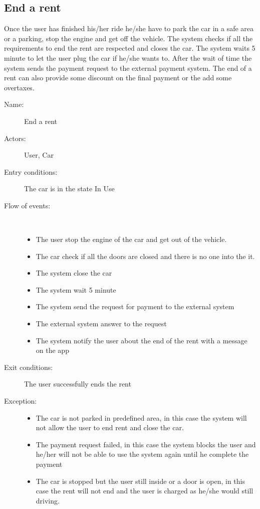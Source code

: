\subsection{End a rent}
Once the user has finished his/her ride he/she have to park the car in a safe area or a parking, stop the engine and get off the vehicle. The system checks if all the requirements to end the rent are respected and closes the car. The system waits 5 minute to let the user plug the car if he/she wants to. After the wait of time the system sends the payment request to the external payment system. The end of a rent can also provide some discount on the final payment or the add some overtaxes.
\begin{description}
	\item[Name:] End a rent
	\item[Actors:] User, Car
	\item[Entry conditions:] The car is in the state In Use
	\item[Flow of events:]  \ \\
		\begin{itemize}
			\item The user stop the engine of the car and get out of the vehicle.
			\item The car check if all the doors are closed and there is no one into the it.
			\item The system close the car
			\item The system wait 5 minute
			\item The system send the request for payment to the external system
			\item The external system answer to the request
			\item The system notify the user about the end of the rent with a message on the app
		\end{itemize}
	\item[Exit conditions:] The user successfully ends the rent
	\item [Exception:]
		\begin{itemize}
			\item The car is not parked in predefined area, in this case the system will not allow the user to end rent and close the car.
			\item The payment request failed, in this case the system blocks the user and he/her will not be able to use the system  again until he complete the payment
			\item The car is stopped but the user still inside or a door is open, in this case the rent will not end and the user is charged as he/she would still driving.
		\end{itemize}
\end{description}
